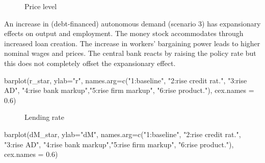 \documentclass[
  letterpaper,
  DIV=11,
  numbers=noendperiod]{scrreprt}
\newenvironment{Shaded}{\begin{snugshade}}{\end{snugshade}}
\newcommand{\AttributeTok}[1]{\textcolor[rgb]{0.40,0.45,0.13}{#1}}
\newcommand{\FloatTok}[1]{\textcolor[rgb]{0.68,0.00,0.00}{#1}}
\newcommand{\FunctionTok}[1]{\textcolor[rgb]{0.28,0.35,0.67}{#1}}
\newcommand{\NormalTok}[1]{\textcolor[rgb]{0.00,0.23,0.31}{#1}}
\newcommand{\StringTok}[1]{\textcolor[rgb]{0.13,0.47,0.30}{#1}}
\begin{document}
\begin{figure}[H]


\caption{\label{fig-price-level-pkmacro}Price level}

\end{figure}%

An increase in (debt-financed) autonomous demand (scenario 3) has
expansionary effects on output and employment. The money stock
accommodates through increased loan creation. The increase in workers'
bargaining power leads to higher nominal wages and prices. The central
bank reacts by raising the policy rate but this does not completely
offset the expansionary effect.

\begin{Shaded}
\begin{Highlighting}[]
\FunctionTok{barplot}\NormalTok{(r\_star, }\AttributeTok{ylab=}\StringTok{"r"}\NormalTok{, }\AttributeTok{names.arg=}\FunctionTok{c}\NormalTok{(}\StringTok{"1:baseline"}\NormalTok{, }\StringTok{"2:rise credit rat."}\NormalTok{, }\StringTok{"3:rise AD"}\NormalTok{,}
                                      \StringTok{"4:rise bank markup"}\NormalTok{,}\StringTok{"5:rise firm markup"}\NormalTok{, }\StringTok{"6:rise product."}\NormalTok{), }\AttributeTok{cex.names =} \FloatTok{0.6}\NormalTok{)}
\end{Highlighting}
\end{Shaded}

\begin{figure}[H]


\caption{\label{fig-lending-rate-pkmacro}Lending rate}

\end{figure}%

\begin{Shaded}
\begin{Highlighting}[]
\FunctionTok{barplot}\NormalTok{(dM\_star, }\AttributeTok{ylab=}\StringTok{"dM"}\NormalTok{, }\AttributeTok{names.arg=}\FunctionTok{c}\NormalTok{(}\StringTok{"1:baseline"}\NormalTok{, }\StringTok{"2:rise credit rat."}\NormalTok{, }\StringTok{"3:rise AD"}\NormalTok{,}
                                        \StringTok{"4:rise bank markup"}\NormalTok{,}\StringTok{"5:rise firm markup"}\NormalTok{, }\StringTok{"6:rise product."}\NormalTok{), }\AttributeTok{cex.names =} \FloatTok{0.6}\NormalTok{)}
\end{Highlighting}
\end{Shaded}
\end{document}
